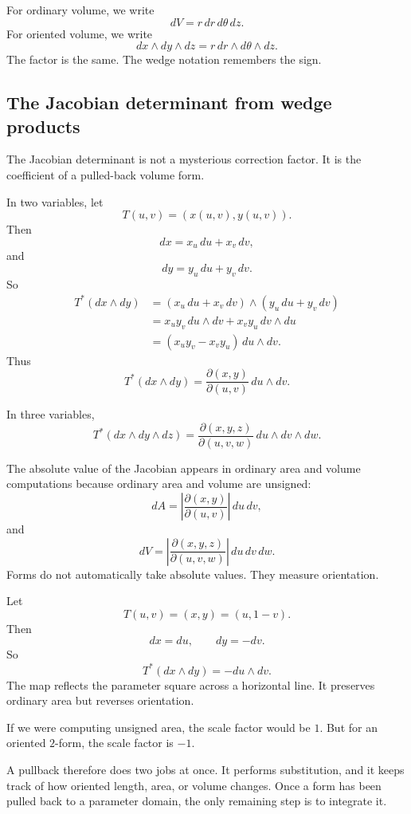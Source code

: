 For ordinary volume, we write
\[
    dV=r\,dr\,d\theta\,dz.
\]
For oriented volume, we write
\[
    dx\wedge dy\wedge dz
    =
    r\,dr\wedge d\theta\wedge dz.
\]
The factor is the same.  The wedge notation remembers the sign.

\subsection{The Jacobian determinant from wedge products}

The Jacobian determinant is not a mysterious correction factor.  It is the coefficient of
a pulled-back volume form.

In two variables, let
\[
    T(u,v)=(x(u,v),y(u,v)).
\]
Then
\[
    dx=x_u\,du+x_v\,dv,
\]
and
\[
    dy=y_u\,du+y_v\,dv.
\]
So
\[
\begin{aligned}
    T^*(dx\wedge dy)
    &=
    (x_u\,du+x_v\,dv)\wedge(y_u\,du+y_v\,dv)\\
    &=
    x_u y_v\,du\wedge dv+x_v y_u\,dv\wedge du\\
    &=
    (x_u y_v-x_v y_u)\,du\wedge dv.
\end{aligned}
\]
Thus
\[
\boxed{
    T^*(dx\wedge dy)
    =
    \frac{\partial(x,y)}{\partial(u,v)}
    \,du\wedge dv.
}
\]

In three variables,
\[
\boxed{
    T^*(dx\wedge dy\wedge dz)
    =
    \frac{\partial(x,y,z)}{\partial(u,v,w)}
    \,du\wedge dv\wedge dw.
}
\]

The absolute value of the Jacobian appears in ordinary area and volume computations
because ordinary area and volume are unsigned:
\[
    dA=\left|\frac{\partial(x,y)}{\partial(u,v)}\right|\,du\,dv,
\]
and
\[
    dV=\left|\frac{\partial(x,y,z)}{\partial(u,v,w)}\right|\,du\,dv\,dw.
\]
Forms do not automatically take absolute values.  They measure orientation.

\begin{example}
Let
\[
    T(u,v)=(x,y)=(u,1-v).
\]
Then
\[
    dx=du,
    \qquad
    dy=-dv.
\]
So
\[
\boxed{
    T^*(dx\wedge dy)=-du\wedge dv.
}
\]
The map reflects the parameter square across a horizontal line.  It preserves ordinary
area but reverses orientation.

If we were computing unsigned area, the scale factor would be \(1\).  But for an
oriented \(2\)-form, the scale factor is \(-1\).
\end{example}

A pullback therefore does two jobs at once.  It performs substitution, and it keeps track
of how oriented length, area, or volume changes.  Once a form has been pulled back to
a parameter domain, the only remaining step is to integrate it.

